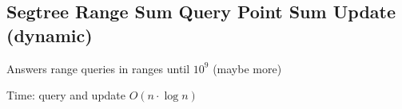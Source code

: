 \subsection{Segtree Range Sum Query Point Sum Update (dynamic)}

Answers range queries in ranges until $10^9$ (maybe more)

Time: query and update $O(n \cdot \log{n})$
